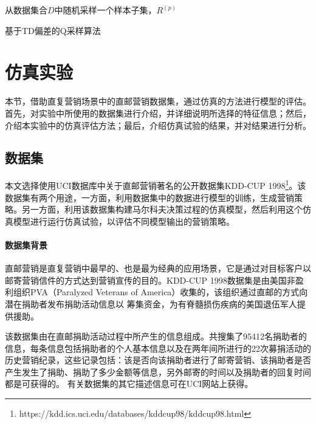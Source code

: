 \begin{algorithm}[htbp]
\small
\SetAlgoLined
{}
从数据集合$D$中随机采样一个样本子集，$R^{(p)}$\;
\caption{基于TD偏差的Q采样算法}
\label{algo:SVR+Q_2}
\end{algorithm}

\section{仿真实验}
本节，借助直复营销场景中的直邮营销数据集，通过仿真的方法进行模型的评估。首先，对实验中所使用的数据集进行介绍，并详细说明所选择的特征信息；然后，介绍本实验中的仿真评估方法；最后，介绍仿真试验的结果，并对结果进行分析。

\subsection{数据集}
本文选择使用UCI数据库中关于直邮营销著名的公开数据集KDD-CUP 1998\footnote{https://kdd.ics.uci.edu/databases/kddcup98/kddcup98.html}。该数据集有两个用途，一方面，利用数据集中的数据进行模型的训练，生成营销策略。另一方面，利用该数据集构建马尔科夫决策过程的仿真模型，然后利用这个仿真模型进行运行仿真试验，以评估不同模型输出的营销策略。

\paragraph{数据集背景}
直邮营销是直复营销中最早的、也是最为经典的应用场景，它是通过对目标客户以邮寄营销信件的方式达到营销宣传的目的。KDD-CUP 1998数据集是由美国非盈利组织PVA（Paralyzed Veterans of America）收集的，该组织通过直邮的方式向潜在捐助者发布捐助活动信息以
筹集资金，为有脊髓损伤疾病的美国退伍军人提供援助。

该数据集由在直邮捐助活动过程中所产生的信息组成。共搜集了95412名捐助者的信息，每条信息包括捐助者的个人基本信息以及在两年间所进行的22次募捐活动的历史营销纪录，这些记录包括：该是否向该捐助者进行了邮寄营销、该捐助者是否产生发生了捐助、捐助了多少金额等信息，另外邮寄的时间以及捐助者的回复时间都是可获得的。
有关数据集的其它描述信息可在UCI网站上获得。


